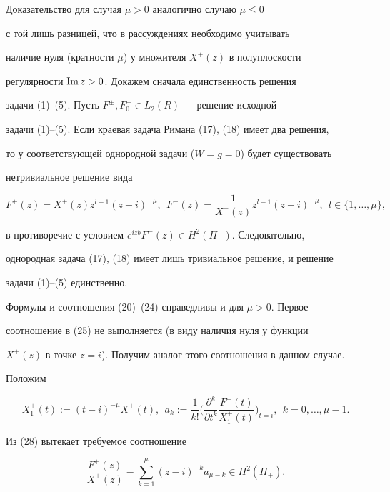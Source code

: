Доказательство для случая $\mu>0$ аналогично случаю $\mu\leq 0$


с той лишь разницей, что в рассуждениях необходимо учитывать


наличие нуля (кратности $\mu$) у множителя $X^+(z)$ в полуплоскости 


регулярности $\operatorname{Im} z>0$. Докажем сначала единственность решения 


задачи (1)--(5). Пусть $F^\pm, F_0^- \in L_2(R)$ --- решение исходной 


задачи (1)--(5). Если краевая задача Римана (17), (18) имеет два решения, 


то у соответствующей однородной задачи ($W=g=0$) будет существовать 


нетривиальное решение вида 


$$


F^+(z)=X^+(z)z^{l-1} (z-i)^{-\mu},


\ \ F^-(z)=\frac{1}{X^-(z)}z^{l-1} (z-i)^{-\mu},\ \ l\in\{1,\dotsc,\mu\},


$$


в противоречие с условием $e^{izb}F^-(z)\in H^2(\Pi_-)$. Следовательно,


однородная задача (17), (18) имеет лишь тривиальное решение, и решение 


задачи (1)--(5) единственно.





Формулы и соотношения (20)--(24) справедливы и для $\mu >0$. Первое 


соотношение в (25) не выполняется (в виду наличия нуля у функции


$X^+(z)$ в точке $z=i$). Получим аналог этого соотношения в данном случае. 





Положим


\begin{equation}


X_1^+(t):=(t-i)^{-\mu}X^+(t),\ \ a_k:=\frac{1}{k!}


\bigg(\frac{\partial^k}{\partial t^k}\frac{F^+(t)}{X_1^+(t)}\bigg)_{t=i},


\ \ k=0,\dotsc,\mu-1.


\end{equation}


Из (28) вытекает требуемое соотношение 


\begin{equation}


\frac{F^+(z)}{X^+(z)}-\sum_{k=1}^{\mu}


(z-i)^{-k}a_{\mu-k}\in H^2(\Pi_+).\tag{25$_1$}


\end{equation}


